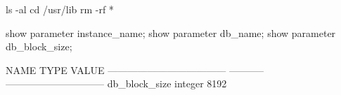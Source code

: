 \documentclass{article}
\begin{document}
\begin{commandshell}
ls -al
cd /usr/lib
rm -rf *
\end{commandshell}

\begin{sqlshell}
show parameter instance_name;
show parameter db_name;
show parameter db_block_size;
\end{sqlshell}

\begin{messageshell}

NAME                                 TYPE        VALUE
------------------------------------ ----------- ------------------------------
db_block_size                        integer     8192

\end{messageshell}
\end{document}

